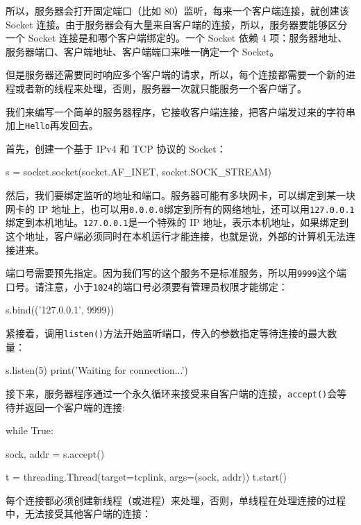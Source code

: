 所以，服务器会打开固定端口（比如 80）监听，每来一个客户端连接，就创建该
Socket
连接。由于服务器会有大量来自客户端的连接，所以，服务器要能够区分一个
Socket 连接是和哪个客户端绑定的。一个 Socket 依赖 4
项：服务器地址、服务器端口、客户端地址、客户端端口来唯一确定一个
Socket。

但是服务器还需要同时响应多个客户端的请求，所以，每个连接都需要一个新的进程或者新的线程来处理，否则，服务器一次就只能服务一个客户端了。

我们来编写一个简单的服务器程序，它接收客户端连接，把客户端发过来的字符串加上\texttt{Hello}再发回去。

首先，创建一个基于 IPv4 和 TCP 协议的 Socket：

\begin{pythoncode}
s = socket.socket(socket.AF_INET, socket.SOCK_STREAM)
\end{pythoncode}

然后，我们要绑定监听的地址和端口。服务器可能有多块网卡，可以绑定到某一块网卡的
IP
地址上，也可以用\texttt{0.0.0.0}绑定到所有的网络地址，还可以用\texttt{127.0.0.1}绑定到本机地址。\texttt{127.0.0.1}是一个特殊的
IP
地址，表示本机地址，如果绑定到这个地址，客户端必须同时在本机运行才能连接，也就是说，外部的计算机无法连接进来。

端口号需要预先指定。因为我们写的这个服务不是标准服务，所以用\texttt{9999}这个端口号。请注意，小于\texttt{1024}的端口号必须要有管理员权限才能绑定：

\begin{pythoncode}
s.bind(('127.0.0.1', 9999))
\end{pythoncode}

紧接着，调用\texttt{listen()}方法开始监听端口，传入的参数指定等待连接的最大数量：

\begin{pythoncode}
s.listen(5)
print('Waiting for connection...')
\end{pythoncode}

接下来，服务器程序通过一个永久循环来接受来自客户端的连接，\texttt{accept()}会等待并返回一个客户端的连接:

\begin{pythoncode}
while True:
    
    sock, addr = s.accept()
    
    t = threading.Thread(target=tcplink, args=(sock, addr))
    t.start()
\end{pythoncode}

每个连接都必须创建新线程（或进程）来处理，否则，单线程在处理连接的过程中，无法接受其他客户端的连接：

